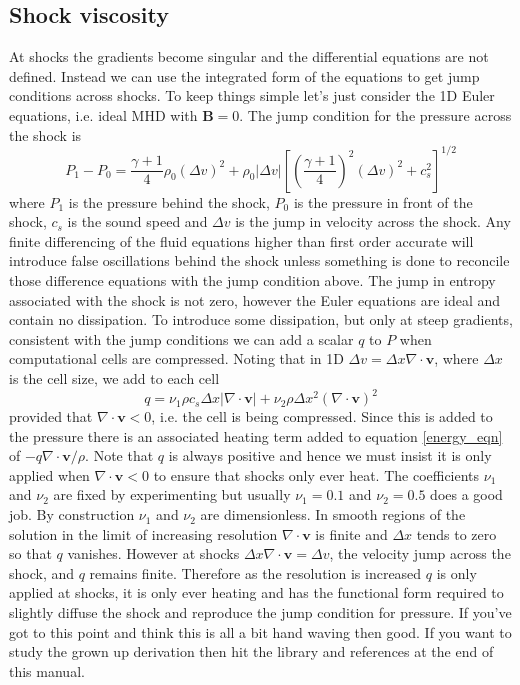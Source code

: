 \documentclass[11pt]{article}
\begin{document}
\subsection{Shock viscosity}
At shocks the gradients become singular and the differential equations are not defined. Instead we can use the integrated form of the equations to get jump conditions across shocks. To keep things simple let's just consider the 1D Euler equations, i.e. ideal MHD with $\mathbf{B}=0$. The jump condition for the pressure across the shock is 
\begin{equation}
P_1-P_0=\frac{\gamma+1}{4}\rho_0(\Delta v)^2 + \rho_0 |\Delta v|\left[\left(\frac{\gamma+1}{4}\right)^2(\Delta v)^2 + c_s^2\right]^{1/2}\label{jump}
\end{equation}
where $P_1$ is the pressure behind the shock, $P_0$ is the pressure in front of the shock, $c_s$ is the sound speed and $\Delta v$ is the jump in velocity across the shock. Any finite differencing of the fluid equations higher than first order accurate will introduce false oscillations behind the shock unless something is done to reconcile those difference equations with the jump condition above. The jump in entropy associated with the shock is not zero, however the Euler equations are ideal and contain no dissipation. To introduce some dissipation, but only at steep gradients, consistent with the jump conditions we can add a scalar $q$ to $P$ when computational cells are compressed. Noting that in 1D $\Delta v=\Delta x \nabla\cdot\mathbf{v}$, where $\Delta x$ is the cell size, we add to each cell
\begin{displaymath}
q = \nu_1 \rho c_s \Delta x |\nabla\cdot\mathbf{v}| + \nu_2 \rho \Delta x^2 (\nabla\cdot\mathbf{v})^2
\end{displaymath}
provided that $\nabla\cdot\mathbf{v}<0$, i.e. the cell is being compressed. Since this is added to the pressure there is an associated heating term added to equation \ref{energy_eqn} of $-q \nabla\cdot\mathbf{v}/\rho$. Note that $q$ is always positive and hence we must insist it is only applied when $\nabla\cdot\mathbf{v}<0$ to ensure that shocks only ever heat. The coefficients $\nu_1$ and $\nu_2$ are fixed by experimenting but usually $\nu_1=0.1$ and $\nu_2=0.5$ does a good job. By construction $\nu_1$ and $\nu_2$ are dimensionless. In smooth regions of the solution in the limit of increasing resolution $\nabla\cdot\mathbf{v}$ is finite and $\Delta x$ tends to zero so that $q$ vanishes. However at shocks $\Delta x \nabla\cdot\mathbf{v}=\Delta v$, the velocity jump across the shock, and $q$ remains finite. Therefore as the resolution is increased $q$ is only applied at shocks, it is only ever heating and has the functional form required to slightly diffuse the shock and reproduce the jump condition for pressure. If you've got to this point and think this is all a bit hand waving then good. If you want to study the grown up derivation then hit the library and references at the end of this manual. 
\end{document}
